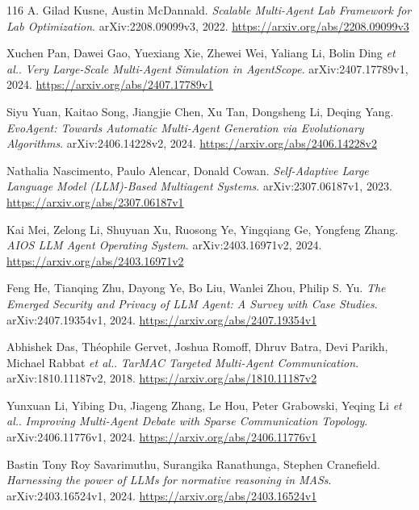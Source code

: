 \documentclass[11pt,a4paper]{article}
\begin{document}
\begin{thebibliography}{116}
A. Gilad Kusne, Austin McDannald.
\newblock \emph{Scalable Multi-Agent Lab Framework for Lab Optimization}.
\newblock arXiv:2208.09099v3, 2022.
\newblock \url{https://arxiv.org/abs/2208.09099v3}

Xuchen Pan, Dawei Gao, Yuexiang Xie, Zhewei Wei, Yaliang Li, Bolin Ding \emph{et al.}.
\newblock \emph{Very Large-Scale Multi-Agent Simulation in AgentScope}.
\newblock arXiv:2407.17789v1, 2024.
\newblock \url{https://arxiv.org/abs/2407.17789v1}

Siyu Yuan, Kaitao Song, Jiangjie Chen, Xu Tan, Dongsheng Li, Deqing Yang.
\newblock \emph{EvoAgent: Towards Automatic Multi-Agent Generation via Evolutionary Algorithms}.
\newblock arXiv:2406.14228v2, 2024.
\newblock \url{https://arxiv.org/abs/2406.14228v2}

Nathalia Nascimento, Paulo Alencar, Donald Cowan.
\newblock \emph{Self-Adaptive Large Language Model (LLM)-Based Multiagent Systems}.
\newblock arXiv:2307.06187v1, 2023.
\newblock \url{https://arxiv.org/abs/2307.06187v1}

Kai Mei, Zelong Li, Shuyuan Xu, Ruosong Ye, Yingqiang Ge, Yongfeng Zhang.
\newblock \emph{AIOS LLM Agent Operating System}.
\newblock arXiv:2403.16971v2, 2024.
\newblock \url{https://arxiv.org/abs/2403.16971v2}

Feng He, Tianqing Zhu, Dayong Ye, Bo Liu, Wanlei Zhou, Philip S. Yu.
\newblock \emph{The Emerged Security and Privacy of LLM Agent: A Survey with Case Studies}.
\newblock arXiv:2407.19354v1, 2024.
\newblock \url{https://arxiv.org/abs/2407.19354v1}

Abhishek Das, Th\'{e}ophile Gervet, Joshua Romoff, Dhruv Batra, Devi Parikh, Michael Rabbat \emph{et al.}.
\newblock \emph{TarMAC Targeted Multi-Agent Communication}.
\newblock arXiv:1810.11187v2, 2018.
\newblock \url{https://arxiv.org/abs/1810.11187v2}

Yunxuan Li, Yibing Du, Jiageng Zhang, Le Hou, Peter Grabowski, Yeqing Li \emph{et al.}.
\newblock \emph{Improving Multi-Agent Debate with Sparse Communication Topology}.
\newblock arXiv:2406.11776v1, 2024.
\newblock \url{https://arxiv.org/abs/2406.11776v1}

Bastin Tony Roy Savarimuthu, Surangika Ranathunga, Stephen Cranefield.
\newblock \emph{Harnessing the power of LLMs for normative reasoning in MASs}.
\newblock arXiv:2403.16524v1, 2024.
\newblock \url{https://arxiv.org/abs/2403.16524v1}


\end{thebibliography}
\end{document}
